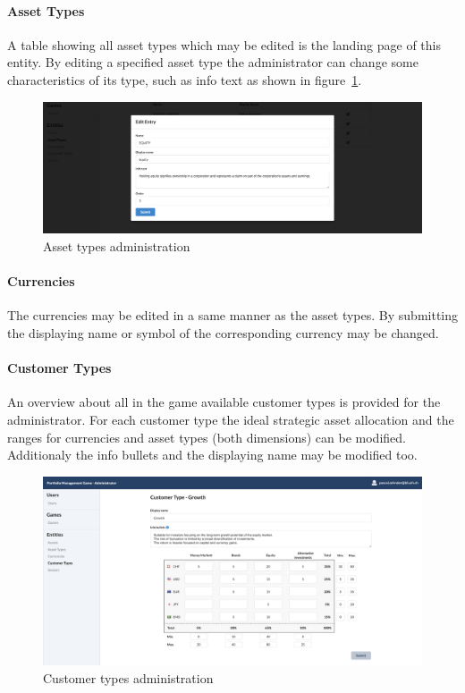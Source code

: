\paragraph{Asset Types}
A table showing all asset types which may be edited is the landing page of this entity. By editing a specified asset type the administrator can change some characteristics of its type, such as info text as shown in figure~\ref{fig:asset_types}.
\begin{figure}[h!]
  \centering
  \includegraphics[scale=0.2]{img/application-overview/administrator/entities_asset_types.png}
  \caption{Asset types administration}
  \label{fig:asset_types}
\end{figure}

\paragraph{Currencies}
The currencies may be edited in a same manner as the asset types. By submitting the displaying name or symbol of the corresponding currency may be changed.

\paragraph{Customer Types}
An overview about all in the game available customer types is provided for the administrator. For each customer type the ideal strategic asset allocation and the ranges for currencies and asset types (both dimensions) can be modified. Additionaly the info bullets and the displaying name may be modified too.
\begin{figure}[h!]
  \centering
  \includegraphics[scale=0.2]{img/application-overview/administrator/entities_customer_types.png}
  \caption{Customer types administration}
\end{figure}


